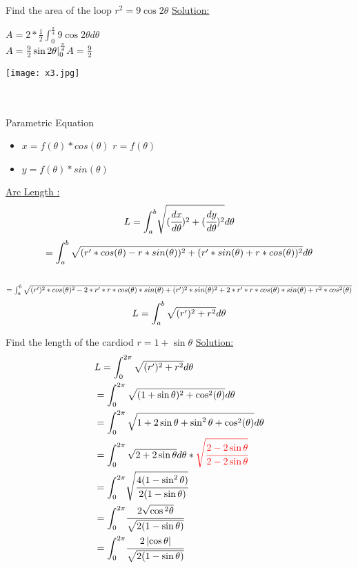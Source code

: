 \begin{example}
Find the area of the loop $r^2=9\cos 2\theta$ 
{\color{smalt(darkpowderblue)}\underline {Solution:}}\\
\begin{minipage}{0.4\textwidth}
$A=2*\frac{1}{2} \int_{0}^{\frac{\pi}{4}} 9\cos 2\theta d\theta$ \\
$A=\frac{9}{2} \sin 2\theta |_{0}^{\frac{\pi}{4}} \\A= \frac{9}{2}$ \\
\end{minipage}
\begin{minipage}{0.5\textwidth}
\texttt{[image: x3.jpg]}
\end{minipage} \\
\noindent{\color{smalt(darkpowderblue)}\rule{\linewidth}{.2mm}}\\
{\color{smalt(darkpowderblue)}Parametric Equation}
\begin{itemize}
    \item $x=f(\theta) *cos(\theta)$ \hspace{1cm} $r=f(\theta)$
    \item $y=f(\theta) *sin(\theta)$
\end{itemize}
\end{example}
{\color{smalt(darkpowderblue)}\underline {Arc Length :}}\\
$$L={\Huge \int_{a}^{b}}\sqrt{(\cfrac{dx}{d\theta})^2+(\cfrac{dy}{d\theta})^2} d\theta $$
$$={\Huge \int_{a}^{b}\sqrt{(r'*cos(\theta)-r*sin(\theta))^2+(r'*sin(\theta)+r*cos(\theta))^2 }}d\theta$$\\
 $={\Huge \int_{a}^{b} \sqrt{ (r')^2*cos(\theta)^2 -2*r'*r*cos(\theta)*sin(\theta)+(r')^2*sin(\theta)^2+2*r'*r*cos(\theta)*sin(\theta)+r^2*cos^2(\theta)}}$\\
 $$L= {\Huge \int_{a}^{b} \sqrt{(r')^2+r^2}d\theta}$$
\begin{example}
Find the length of the cardiod $r=1+\sin{\theta}$
{\color{smalt(darkpowderblue)}\underline {Solution:}}\\
\begin{align*}
    & L= {\Huge \int_{0}^{2\pi} \sqrt{(r')^2+r^2}d\theta}\\
    & = {\Huge \int_{0}^{2\pi} \sqrt{(1+\sin{\theta})^2+\cos^2(\theta)}d\theta }\\
    &={\Huge \int_{0}^{2\pi} \sqrt{1+2\sin{\theta}+\sin^2{\theta}+\cos^2(\theta)}d\theta }\\
    &={\Huge \int_{0}^{2\pi} \sqrt{2+2\sin{\theta}}d\theta }*\color{red}\sqrt{\cfrac{2-2\sin{\theta}}{2-2\sin{\theta}}}\\
     &={\Huge \int_{0}^{2\pi}} \sqrt{\cfrac{4(1-\sin^2{\theta})}{2(1-\sin{\theta})}}\\
        &={\Huge \int_{0}^{2\pi}} {\cfrac{2\sqrt{\cos{^2{\theta}}}}{\sqrt{2(1-\sin{\theta})}}}\\
         &={\Huge \int_{0}^{2\pi}} {\cfrac{2\left|  {\cos{{\theta}}}\right|}{\sqrt{2(1-\sin{\theta})}}}\\
\end{align*}
\end{example}
